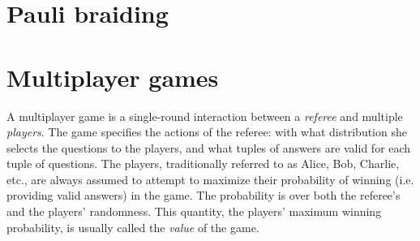 \section{Pauli braiding}
\label{section-paulibraiding}



\section{Multiplayer games}
\label{section:multigames}


A multiplayer game is a single-round interaction between a \emph{referee} and multiple \emph{players}. The game specifies the actions of the referee: with what distribution she selects the questions to the players, and what tuples of answers are valid for each tuple of questions. The players, traditionally referred to as Alice, Bob, Charlie, etc., are always assumed to attempt to maximize their probability of winning (i.e. providing valid answers) in the game. The probability is over both the referee's and the players' randomness. This quantity, the players' maximum winning probability, is usually called the \emph{value} of the game.

